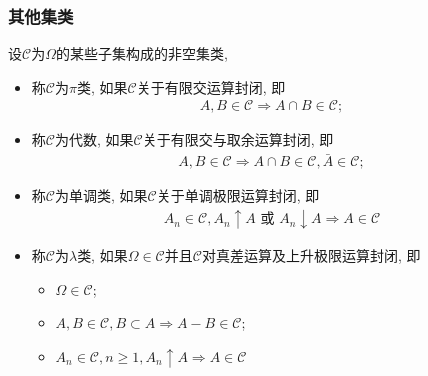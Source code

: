 \documentclass[Prob-All.tex]{subfiles}
\begin{document}
\begin{frame}
	\frametitle{其他集类}
	\begin{defi}
	  设$\mathcal{C}$为$\Omega$的某些子集构成的非空集类,
	  \begin{itemize}[<+-|alert@+>]
	  \item 称$\mathcal{C}$为$\pi$类, 如果$\mathcal{C}$关于有限交运算封闭, 即
		\begin{eqnarray*}
		  A,B\in \mathcal{C}\Rightarrow A\cap B\in \mathcal{C};
		\end{eqnarray*}
	  \item 称$\mathcal{C}$为代数, 如果$\mathcal{C}$关于有限交与取余运算封闭, 即
		\begin{eqnarray*}
		  A,B\in \mathcal{C}\Rightarrow A\cap B\in \mathcal{C}, \bar{A}\in \mathcal{C};
		\end{eqnarray*}
	  \item 称$\mathcal{C}$为单调类, 如果$\mathcal{C}$关于单调极限运算封闭, 即
		\begin{eqnarray*}
		  A_n\in \mathcal{C}, A_n\uparrow A \mbox{ 或 } A_n\downarrow A \Rightarrow A\in \mathcal{C}
		\end{eqnarray*}
	  \item 称$\mathcal{C}$为$\lambda$类, 如果$\Omega\in \mathcal{C}$并且$\mathcal{C}$对真差运算及上升极限运算封闭, 即
		\begin{itemize}
		\item $\Omega\in \mathcal{C}$;
		\item $A, B\in \mathcal{C}, B\subset A\Rightarrow A-B\in \mathcal{C}$;
		\item $A_n\in \mathcal{C}, n\geq 1, A_n\uparrow A\Rightarrow A\in \mathcal{C}$
		\end{itemize}

	  \end{itemize}

	\end{defi}
  \end{frame}
\end{document}
